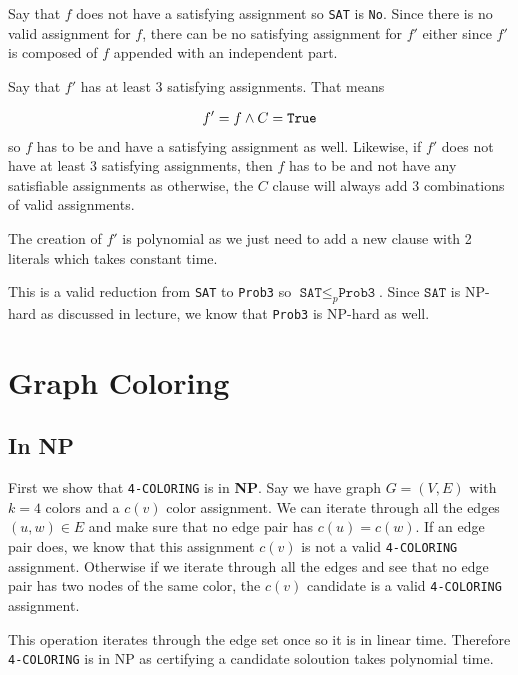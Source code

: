 \documentclass{article}
\begin{document}
\begin{enumerate}
                Say that $f$ does not have a satisfying assignment so \texttt{SAT} is \texttt{No}. 
                Since there is no valid assignment for $f$, there can be no satisfying assignment for $f'$ either since $f'$ is composed of $f$ appended with an independent part.
                
                Say that $f'$ has at least 3 satisfying assignments. That means
                
                \begin{align*}
                        f' = f \land C = \texttt{True}
                \end{align*} 
                so $f$ has to be \True and have a satisfying assignment as well. 
                Likewise, if $f'$ does not have at least 3 satisfying assignments, then $f$ has to be \False and not have any satisfiable assignments as otherwise, the $C$ clause will always add 3 combinations of valid assignments.

                The creation of $f'$ is polynomial as we just need to add a new clause with 2 literals which takes constant time.

                This is a valid reduction from \texttt{SAT} to \texttt{Prob3} so $\texttt{SAT} \leq_p \texttt{Prob3}$.
                Since $\texttt{SAT}$ is NP-hard as discussed in lecture, we know that \texttt{Prob3} is NP-hard as well.
\end{enumerate}
\newpage
\section{Graph Coloring}
\subsection{In NP}
First we show that \texttt{4-COLORING} is in \textbf{NP}.
Say we have graph $G = (V, E)$ with $k=4$ colors and a $c(v)$ color assignment. We can iterate through all the edges $(u, w) \in E$ and make sure that no edge pair has $c(u) = c(w)$.
If an edge pair does, we know that this assignment $c(v)$ is not a valid \texttt{4-COLORING} assignment. Otherwise if we iterate through all the edges and see that no edge pair has two nodes of the same color,
the $c(v)$ candidate is a valid \texttt{4-COLORING} assignment.

This operation iterates through the edge set once so it is in linear time. Therefore \texttt{4-COLORING} is in NP as certifying a candidate soloution takes polynomial time.
\end{document}
